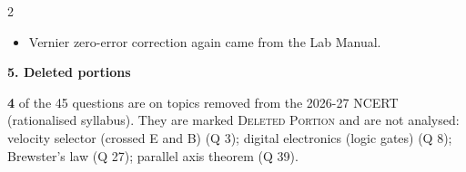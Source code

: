 \begin{multicols}{2}
{\begin{itemize}[leftmargin=1em,nosep]
\item Vernier zero-error correction again came from the Lab Manual.
\end{itemize}}\par\medskip
\textbf{\color{crimson}5. Deleted portions}\par\smallskip
\textbf{4} of the 45 questions are on topics removed from the 2026-27 NCERT (rationalised syllabus). They are marked \textsc{Deleted Portion} and are not analysed: velocity selector (crossed E and B) (Q 3); digital electronics (logic gates) (Q 8); Brewster's law (Q 27); parallel axis theorem (Q 39).\par
\end{multicols}



